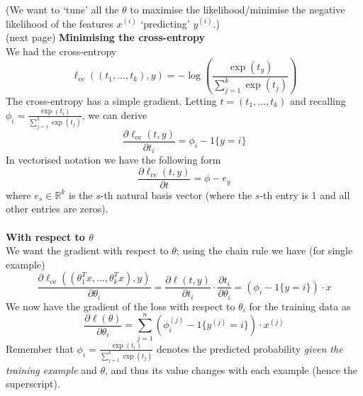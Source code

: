 \documentclass{report}
\begin{document}
(We want to `tune' all the $\theta$ to maximise the likelihood/minimise the negative likelihood
of the features $x^{(i)}$ `predicting' $y^{(i)}$.)\\
(next page)
\newpage
\noindent\textbf{Minimising the cross-entropy}\\
We had the cross-entropy
\begin{equation*}
\ell_{\text{ce}}((t_1,\ldots,t_k),y)=-\log\left(\frac{\exp(t_y)}{\sum^k_{j=1}\exp(t_j)}\right)
\end{equation*}
The cross-entropy has a simple gradient. Letting 
$t=(t_1,\ldots,t_k)$ and recalling $\phi_i=\frac{\exp(t_i)}{\sum^k_{j=1}\exp(t_j)}$, we can derive
\begin{equation*}
\frac{\partial\ell_{\text{ce}}(t,y)}{\partial t_i}=\phi_i-1\{y=i\}
\end{equation*}
In vectorised notation we have the following form
\begin{equation*}
\frac{\partial\ell_{\text{ce}}(t,y)}{\partial t}=\phi-e_y
\end{equation*}
where $e_s\in\mathbb{R}^k$ is the $s$-th natural basis vector (where the $s$-th entry is 1 and all other entries
are zeros).\\
\vspace{1mm}\\
\textbf{With respect to $\theta$}\\
We want the gradient with respect to $\theta$; using the chain rule we have (for single example)
\begin{equation*}
\frac{\partial\ell_{\text{ce}}((\theta_1^Tx,\ldots,\theta_k^Tx),y)}{\partial\theta_i}
=\frac{\partial\ell(t,y)}{\partial t_i}\cdot\frac{\partial t_i}{\partial\theta_i}=(\phi_i-1\{y=i\})\cdot x
\end{equation*}
We now have the gradient of the loss with respect to $\theta_i$ for the training data as
\begin{equation*}
\frac{\partial\ell(\theta)}{\partial\theta_i}
=\sum^n_{j=1}(\phi_i^{(j)}-1\{y^{(j)}=i\})\cdot x^{(j)}
\end{equation*}
Remember that $\phi_i=\frac{\exp(t_i)}{\sum^k_{j=1}\exp(t_j)}$ denotes the predicted probability \textit{given the training example} and 
$\theta$, and thus its
value changes with each example (hence the superscript).
\newpage
\end{document}

